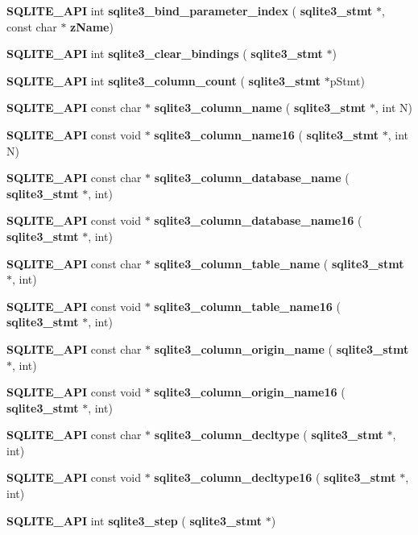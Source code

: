 \begin{DoxyCompactItemize}
\item 
\textbf{ S\+Q\+L\+I\+T\+E\+\_\+\+A\+PI} int \textbf{ sqlite3\+\_\+bind\+\_\+parameter\+\_\+index} (\textbf{ sqlite3\+\_\+stmt} $\ast$, const char $\ast$\textbf{ z\+Name})
\item 
\textbf{ S\+Q\+L\+I\+T\+E\+\_\+\+A\+PI} int \textbf{ sqlite3\+\_\+clear\+\_\+bindings} (\textbf{ sqlite3\+\_\+stmt} $\ast$)
\item 
\textbf{ S\+Q\+L\+I\+T\+E\+\_\+\+A\+PI} int \textbf{ sqlite3\+\_\+column\+\_\+count} (\textbf{ sqlite3\+\_\+stmt} $\ast$p\+Stmt)
\item 
\textbf{ S\+Q\+L\+I\+T\+E\+\_\+\+A\+PI} const char $\ast$ \textbf{ sqlite3\+\_\+column\+\_\+name} (\textbf{ sqlite3\+\_\+stmt} $\ast$, int N)
\item 
\textbf{ S\+Q\+L\+I\+T\+E\+\_\+\+A\+PI} const void $\ast$ \textbf{ sqlite3\+\_\+column\+\_\+name16} (\textbf{ sqlite3\+\_\+stmt} $\ast$, int N)
\item 
\textbf{ S\+Q\+L\+I\+T\+E\+\_\+\+A\+PI} const char $\ast$ \textbf{ sqlite3\+\_\+column\+\_\+database\+\_\+name} (\textbf{ sqlite3\+\_\+stmt} $\ast$, int)
\item 
\textbf{ S\+Q\+L\+I\+T\+E\+\_\+\+A\+PI} const void $\ast$ \textbf{ sqlite3\+\_\+column\+\_\+database\+\_\+name16} (\textbf{ sqlite3\+\_\+stmt} $\ast$, int)
\item 
\textbf{ S\+Q\+L\+I\+T\+E\+\_\+\+A\+PI} const char $\ast$ \textbf{ sqlite3\+\_\+column\+\_\+table\+\_\+name} (\textbf{ sqlite3\+\_\+stmt} $\ast$, int)
\item 
\textbf{ S\+Q\+L\+I\+T\+E\+\_\+\+A\+PI} const void $\ast$ \textbf{ sqlite3\+\_\+column\+\_\+table\+\_\+name16} (\textbf{ sqlite3\+\_\+stmt} $\ast$, int)
\item 
\textbf{ S\+Q\+L\+I\+T\+E\+\_\+\+A\+PI} const char $\ast$ \textbf{ sqlite3\+\_\+column\+\_\+origin\+\_\+name} (\textbf{ sqlite3\+\_\+stmt} $\ast$, int)
\item 
\textbf{ S\+Q\+L\+I\+T\+E\+\_\+\+A\+PI} const void $\ast$ \textbf{ sqlite3\+\_\+column\+\_\+origin\+\_\+name16} (\textbf{ sqlite3\+\_\+stmt} $\ast$, int)
\item 
\textbf{ S\+Q\+L\+I\+T\+E\+\_\+\+A\+PI} const char $\ast$ \textbf{ sqlite3\+\_\+column\+\_\+decltype} (\textbf{ sqlite3\+\_\+stmt} $\ast$, int)
\item 
\textbf{ S\+Q\+L\+I\+T\+E\+\_\+\+A\+PI} const void $\ast$ \textbf{ sqlite3\+\_\+column\+\_\+decltype16} (\textbf{ sqlite3\+\_\+stmt} $\ast$, int)
\item 
\textbf{ S\+Q\+L\+I\+T\+E\+\_\+\+A\+PI} int \textbf{ sqlite3\+\_\+step} (\textbf{ sqlite3\+\_\+stmt} $\ast$)

\end{DoxyCompactItemize}

